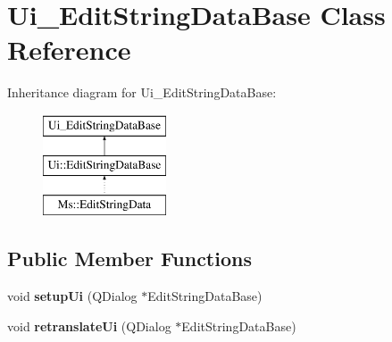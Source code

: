 \hypertarget{class_ui___edit_string_data_base}{}\section{Ui\+\_\+\+Edit\+String\+Data\+Base Class Reference}
\label{class_ui___edit_string_data_base}
Inheritance diagram for Ui\+\_\+\+Edit\+String\+Data\+Base\+:\begin{figure}[H]
\begin{center}
\leavevmode
\includegraphics[height=3.000000cm]{class_ui___edit_string_data_base}
\end{center}
\end{figure}
\subsection*{Public Member Functions}
\begin{DoxyCompactItemize}
\item 
\mbox{\label{class_ui___edit_string_data_base_a4ccf9c264fadeccde5df11dc1122e6a2}} 
void {\bfseries setup\+Ui} (Q\+Dialog $\ast$Edit\+String\+Data\+Base)
\item 
\mbox{\label{class_ui___edit_string_data_base_a1c62e3f085912eed805f502038d5eb2d}} 
void {\bfseries retranslate\+Ui} (Q\+Dialog $\ast$Edit\+String\+Data\+Base)
\end{DoxyCompactItemize}
